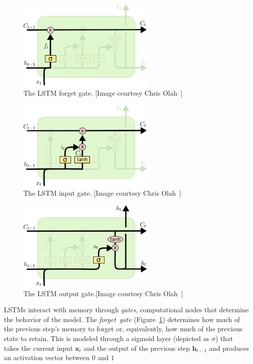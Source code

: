 \begin{figure}[p]
	\centering
	\includegraphics[width=0.6\textwidth]{figures/LSTM_forget_gate.pdf}
	\caption[The LSTM forget gate]
	{The LSTM forget gate. [Image courtesy Chris Olah~\cite{colah_15}]\label{fig:LSTM_forget_gate}}
\end{figure}
\begin{figure}[p]
	\centering
	\includegraphics[width=0.6\textwidth]{figures/LSTM_input_gate.pdf}
	\caption[The LSTM input gate]
	{The LSTM input gate. [Image courtesy Chris Olah~\cite{colah_15}]\label{fig:LSTM_input_gate}}
\end{figure}
\begin{figure}[p]
	\centering
	\includegraphics[width=0.6\textwidth]{figures/LSTM_output_gate.pdf}
	\caption[The LSTM output gate]
	{The LSTM output gate.[Image courtesy Chris Olah~\cite{colah_15}]\label{fig:LSTM_output_gate}}
\end{figure}

LSTMs interact with memory through \emph{gates}, computational nodes that determine the behavior of the model. The \emph{forget~gate} (Figure~\ref{fig:LSTM_forget_gate}) determines how much of the previous step's memory to forget or, equivalently, how much of the previous state to retain.  This is modeled through a sigmoid layer (depicted as $\sigma$) that takes the current input $\mathbf{x}_t$ and the output of the previous step $\mathbf{h}_{t-1}$ and produces an activation vector between $0$ and $1$

